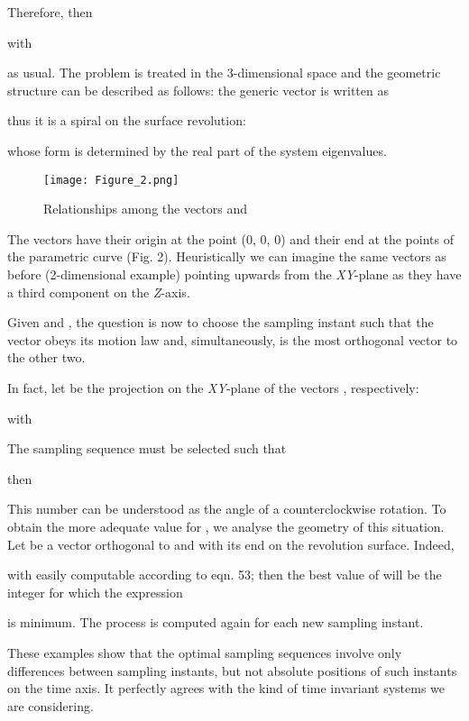 \documentclass{article}
\begin{document}
Therefore,
then


with


 as usual. The problem is treated in the 3-dimensional space and the
geometric structure can be described as follows: the generic
vector  is written as



thus it is a spiral on the surface revolution:

whose form is determined by the real part of
the system eigenvalues.


\begin{figure}
\begin{center}
\texttt{[image: Figure\_2.png]}
\caption{Relationships among the vectors  and }
\label{figure:headings1}
\end{center}
\end{figure}


The vectors  have their origin
at the point (0, 0, 0) and their end at the points  of the parametric curve (Fig. 2). Heuristically we can
imagine the same vectors as before (2-dimensional example)
pointing upwards from the \textit{XY}-plane as they have a third component
on the \textit{Z}-axis.

Given  and , the question is now to choose the sampling
instant such that the vector  obeys its motion law and,
simultaneously, is the most orthogonal vector to the other two.

In fact, let  be the projection on the \textit{XY}-plane of the
vectors  , respectively:







with



The sampling sequence must be selected such that


then


This number can be understood as the angle of a
counterclockwise rotation. To obtain the more adequate value for
, we analyse the geometry of this situation. Let  be a vector
orthogonal to  and  with its end on the revolution surface.
Indeed,


with  easily computable according to eqn. 53; then
the best value of  will be the integer for which the expression



is minimum. The process is computed again for each
new sampling instant.

These examples show that the optimal
sampling sequences involve only differences between sampling
instants, but not absolute positions of such instants on the time
axis. It perfectly agrees with the kind of time invariant systems
we are considering.
\end{document}
